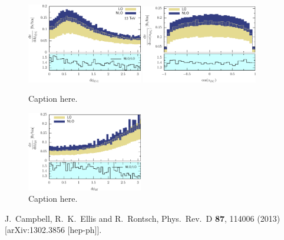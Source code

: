 \documentclass[preprint]{JHEP3} %
\begin{document}
\begin{figure}[h]
\centering %
\includegraphics[width=0.45\textwidth]{./LHC_53_Fig17.eps}
\hfill
\includegraphics[width=0.45\textwidth]{./LHC_53_Fig18.eps}
\caption{\label{fig:i} Caption here.}
\end{figure}




\begin{figure}[h]
\centering %
\includegraphics[width=0.45\textwidth]{./LHC_53_Fig19.eps}
\caption{\label{fig:i} Caption here.}
\end{figure}




\begin{thebibliography}{99}

  J.~Campbell, R.~K.~Ellis and R.~Rontsch,
  Phys.\ Rev.\ D {\bf 87}, 114006 (2013)
  [arXiv:1302.3856 [hep-ph]].


\end{thebibliography}
\end{document}
